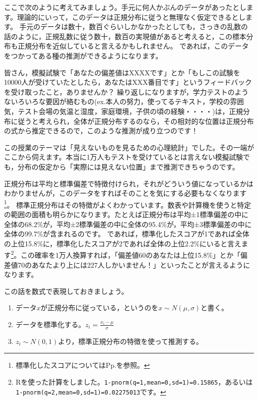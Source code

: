 \documentclass{ltjbook}
\begin{document}
ここで次のように考えてみましょう。手元に何人かぶんのデータがあったとします。理論的にいって，このデータは正規分布に従うと無理なく仮定できるとします。
手元のデータは数十，数百ぐらいしかなかったとしても，さっきの乱数の話のように，正規乱数に従う数十，数百の実現値があると考えると，この標本分布も正規分布を近似していると言えるかもしれません。
であれば，このデータをつかってある種の推測ができるようになります。

皆さん，模擬試験で「あなたの偏差値はXXXXです」とか「もしこの試験を10000人が受けていたとしたら，あなたはXXX番目です」というフィードバックを受け取ったこと，ありませんか？ 
繰り返しになりますが，学力テストのようないろいろな要因が絡むもの(ex.本人の努力，使ってるテキスト，学校の雰囲気，テスト会場の気温と湿度，家庭環境，子供の頃の経験・・・・)は，正規分布に従うと考えられ，全体が正規分布するのなら，その相対的な位置は正規分布の式から推定できるので，このような推測が成り立つのです！

この授業のテーマは「見えないものを見るための心理統計」でした。その一端がここから伺えます。本当に1万人もテストを受けているとは言えない模擬試験でも，分布の仮定から「実際には見えない位置」まで推測できちゃうのです。

正規分布は平均と標準偏差で特徴付けられ，それがどういう値になっているかはわかりませんが，このデータをすればそのことを気にする必要もなくなります\footnote{標準化したスコアについてはPp.\pageref{zScore}を参照。}。
標準正規分布はその特徴がよくわかっています。数表や計算機を使うと特定の範囲の面積も明らかになります。たとえば正規分布は平均±1標準偏差の中に全体の68.2\%が，平均±2標準偏差の中に全体の95.4\%が，平均±3標準偏差の中に全体の99.7\%が含まれるのです。
であれば，標準化したスコアが1であれば全体の上位15.8\%に，標準化したスコアが2であれば全体の上位2.2\%にいると言えます\footnote{Rを使った計算をしました。\texttt{1-pnorm(q=1,mean=0,sd=1)=0.15865}，あるいは\texttt{1-pnorm(q=2,mean=0,sd=1)=0.02275013}です。}。この確率を1万人換算すれば，「偏差値60のあなたは上位15.8\%」とか「偏差値70のあなたより上には227人しかいません！」といったことが言えるようになります。

この話を数式で表現しておきましょう。
\begin{enumerate}
    \item データ$x$が正規分布に従っている，というのを$x \sim N(\mu,\sigma)$と書く。
    \item データを標準化する。$z_i = \frac{x_i - \mu}{\sigma} $
    \item $z_i \sim N(0,1)$より，標準正規分布の特徴を使って推測する。
\end{enumerate}
\end{document}
